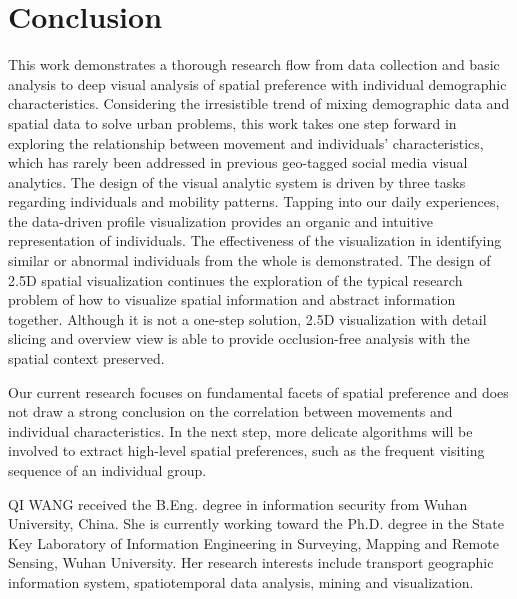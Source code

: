 \documentclass{ieeeaccess}
\begin{document}
\section{Conclusion}
\label{sec:conclusion}
This work demonstrates a thorough research flow from data collection and basic analysis to deep visual analysis of spatial preference with individual demographic characteristics. Considering the irresistible trend of mixing demographic data and spatial data to solve urban problems, this work takes one step forward in exploring the relationship between movement and individuals’ characteristics, which has rarely been addressed in previous geo-tagged social media visual analytics. The design of the visual analytic system is driven by three tasks regarding individuals and mobility patterns. Tapping into our daily experiences, the data-driven profile visualization provides an organic and intuitive representation of individuals. The effectiveness of the visualization in identifying similar or abnormal individuals from the whole is demonstrated. The design of 2.5D spatial visualization continues the exploration of the typical research problem of how to visualize spatial information and abstract information together. Although it is not a one-step solution, 2.5D visualization with detail slicing and overview view is able to provide occlusion-free analysis with the spatial context preserved.

Our current research focuses on fundamental facets of spatial preference and does not draw a strong conclusion on the correlation between movements and individual characteristics. In the next step, more delicate algorithms will be involved to extract high-level spatial preferences, such as the frequent visiting sequence of an individual group.




\begin{IEEEbiography}{QI WANG} received the B.Eng. degree in information security from Wuhan University, China. She is currently working toward the Ph.D. degree in the State Key Laboratory of Information Engineering in Surveying, Mapping and Remote Sensing, Wuhan University. Her research interests include transport geographic information system, spatiotemporal data analysis, mining and visualization.
\end{IEEEbiography}
\end{document}
